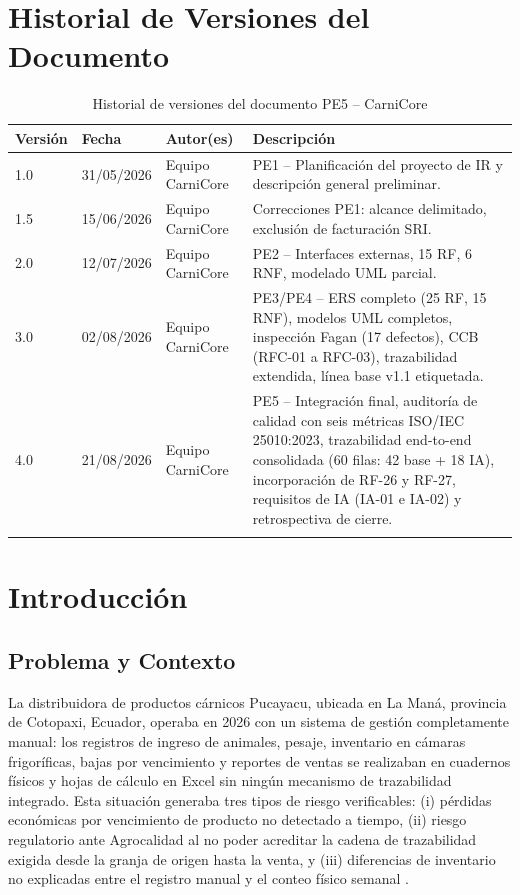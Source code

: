 \documentclass[11pt,a4paper]{article}
\begin{document}
\section*{Historial de Versiones del Documento}
\begin{longtable}{|p{1.5cm}|p{2.5cm}|p{3.5cm}|p{7cm}|}
\hline
\textbf{Versión} & \textbf{Fecha} & \textbf{Autor(es)} & \textbf{Descripción} \\
\hline
1.0 & 31/05/2026 & Equipo CarniCore & PE1 -- Planificación del proyecto de IR y descripción general preliminar. \\
\hline
1.5 & 15/06/2026 & Equipo CarniCore & Correcciones PE1: alcance delimitado, exclusión de facturación SRI. \\
\hline
2.0 & 12/07/2026 & Equipo CarniCore & PE2 -- Interfaces externas, 15 RF, 6 RNF, modelado UML parcial. \\
\hline
3.0 & 02/08/2026 & Equipo CarniCore & PE3/PE4 -- ERS completo (25 RF, 15 RNF), modelos UML completos, inspección Fagan (17 defectos), CCB (RFC-01 a RFC-03), trazabilidad extendida, línea base v1.1 etiquetada. \\
\hline
4.0 & 21/08/2026 & Equipo CarniCore & PE5 -- Integración final, auditoría de calidad con seis métricas ISO/IEC 25010:2023, trazabilidad end-to-end consolidada (60 filas: 42 base + 18 IA), incorporación de RF-26 y RF-27, requisitos de IA (IA-01 e IA-02) y retrospectiva de cierre. \\
\hline
\caption{Historial de versiones del documento PE5 -- CarniCore}
\label{tab:historial}
\end{longtable}

\section{Introducción}

\subsection{Problema y Contexto}

La distribuidora de productos cárnicos Pucayacu, ubicada en La Maná, provincia de Cotopaxi, Ecuador, operaba en 2026 con un sistema de gestión completamente manual: los registros de ingreso de animales, pesaje, inventario en cámaras frigoríficas, bajas por vencimiento y reportes de ventas se realizaban en cuadernos físicos y hojas de cálculo en Excel sin ningún mecanismo de trazabilidad integrado. Esta situación generaba tres tipos de riesgo verificables: (i) pérdidas económicas por vencimiento de producto no detectado a tiempo, (ii) riesgo regulatorio ante Agrocalidad al no poder acreditar la cadena de trazabilidad exigida desde la granja de origen hasta la venta, y (iii) diferencias de inventario no explicadas entre el registro manual y el conteo físico semanal \cite{pohl2025}.
\end{document}
